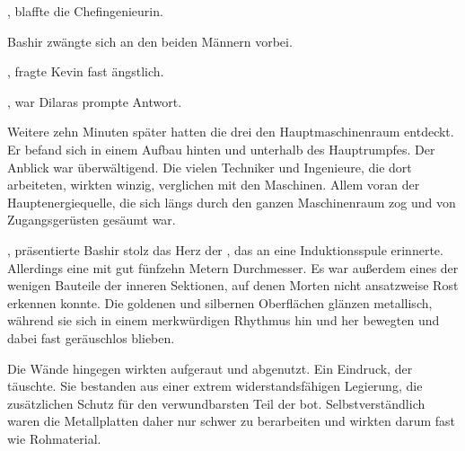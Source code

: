 , blaffte die Chefingenieurin. 

\par

Bashir zwängte sich an den beiden Männern vorbei.

\par

, fragte Kevin fast ängstlich.

\par

, war Dilaras prompte Antwort. 

\par

Weitere zehn Minuten später hatten die drei den Hauptmaschinenraum entdeckt. Er befand sich in einem Aufbau hinten und unterhalb des Hauptrumpfes. Der Anblick war überwältigend. Die vielen Techniker und Ingenieure, die dort arbeiteten, wirkten winzig, verglichen mit den Maschinen. Allem voran der Hauptenergiequelle, die sich längs durch den ganzen Maschinenraum zog und von Zugangsgerüsten gesäumt war.

\par

, präsentierte Bashir stolz das Herz der , das an eine Induktionsspule erinnerte. Allerdings eine mit gut fünfzehn Metern Durchmesser. Es war außerdem eines der wenigen Bauteile der inneren Sektionen, auf denen Morten nicht ansatzweise Rost erkennen konnte. Die goldenen und silbernen Oberflächen glänzen metallisch, während sie sich in einem merkwürdigen Rhythmus hin und her bewegten und dabei fast geräuschlos blieben.

\par

Die Wände hingegen wirkten aufgeraut und abgenutzt. Ein Eindruck, der täuschte. Sie bestanden aus einer extrem widerstandsfähigen Legierung, die zusätzlichen Schutz für den verwundbarsten Teil der  bot. Selbstverständlich waren die Metallplatten daher nur schwer zu berarbeiten und wirkten darum fast wie Rohmaterial.

